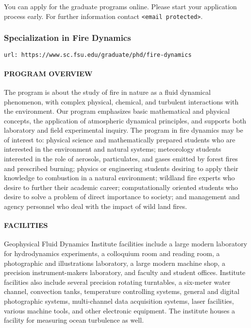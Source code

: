 \documentclass[12pt,a4paper]{article}
\begin{document}
You can apply for the graduate programs online. Please start your application process early. For further information contact \texttt{<email protected>}.

\subsubsection{Specialization in Fire Dynamics}
\texttt{url: https://www.sc.fsu.edu/graduate/phd/fire-dynamics}

\paragraph{PROGRAM OVERVIEW} The program is about the study of fire in nature as a fluid dynamical phenomenon, with complex physical, chemical, and turbulent interactions with the environment. Our program emphasizes basic mathematical and physical concepts, the application of atmospheric dynamical principles, and supports both laboratory and field experimental inquiry. The program in fire dynamics may be of interest to: physical science and mathematically prepared students who are interested in the environment and natural systems; meteorology students interested in the role of aerosols, particulates, and gases emitted by forest fires and prescribed burning; physics or engineering students desiring to apply their knowledge to combustion in a natural environment; wildland fire experts who desire to further their academic career; computationally oriented students who desire to solve a problem of direct importance to society; and management and agency personnel who deal with the impact of wild land fires.

\paragraph{FACILITIES} Geophysical Fluid Dynamics Institute facilities include a large modern laboratory for hydrodynamics experiments, a colloquium room and reading room, a photographic and illustrations laboratory, a large modern machine shop, a precision instrument-makers laboratory, and faculty and student offices. Institute facilities also include several precision rotating turntables, a six-meter water channel, convection tanks, temperature controlling systems, general and digital photographic systems, multi-channel data acquisition systems, laser facilities, various machine tools, and other electronic equipment. The institute houses a facility for measuring ocean turbulence as well.
\end{document}
